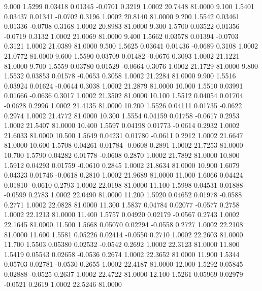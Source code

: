    9.000   1.5299   0.03418   0.01345  -0.0701   0.3219   1.0002  20.7448  81.0000
   9.100   1.5401   0.03437   0.01341  -0.0702   0.3196   1.0002  20.8140  81.0000
   9.200   1.5542   0.03461   0.01336  -0.0708   0.3168   1.0002  20.8983  81.0000
   9.300   1.5700   0.03522   0.01356  -0.0719   0.3132   1.0002  21.0069  81.0000
   9.400   1.5662   0.03578   0.01394  -0.0703   0.3121   1.0002  21.0389  81.0000
   9.500   1.5625   0.03641   0.01436  -0.0689   0.3108   1.0002  21.0772  81.0000
   9.600   1.5590   0.03709   0.01482  -0.0676   0.3093   1.0002  21.1221  81.0000
   9.700   1.5559   0.03780   0.01529  -0.0664   0.3076   1.0002  21.1729  81.0000
   9.800   1.5532   0.03853   0.01578  -0.0653   0.3058   1.0002  21.2284  81.0000
   9.900   1.5516   0.03924   0.01624  -0.0644   0.3038   1.0002  21.2879  81.0000
  10.000   1.5510   0.03991   0.01666  -0.0636   0.3017   1.0002  21.3502  81.0000
  10.100   1.5512   0.04054   0.01704  -0.0628   0.2996   1.0002  21.4135  81.0000
  10.200   1.5526   0.04111   0.01735  -0.0622   0.2974   1.0002  21.4772  81.0000
  10.300   1.5554   0.04159   0.01758  -0.0617   0.2953   1.0002  21.5407  81.0000
  10.400   1.5597   0.04198   0.01773  -0.0614   0.2932   1.0002  21.6033  81.0000
  10.500   1.5649   0.04231   0.01780  -0.0611   0.2912   1.0002  21.6647  81.0000
  10.600   1.5708   0.04261   0.01784  -0.0608   0.2891   1.0002  21.7253  81.0000
  10.700   1.5790   0.04282   0.01778  -0.0608   0.2870   1.0002  21.7892  81.0000
  10.800   1.5912   0.04293   0.01759  -0.0610   0.2845   1.0002  21.8634  81.0000
  10.900   1.6079   0.04323   0.01746  -0.0618   0.2810   1.0002  21.9689  81.0000
  11.000   1.6066   0.04424   0.01810  -0.0610   0.2793   1.0002  22.0198  81.0000
  11.100   1.5998   0.04531   0.01888  -0.0599   0.2783   1.0002  22.0490  81.0000
  11.200   1.5920   0.04652   0.01978  -0.0588   0.2771   1.0002  22.0828  81.0000
  11.300   1.5837   0.04784   0.02077  -0.0577   0.2758   1.0002  22.1213  81.0000
  11.400   1.5757   0.04920   0.02179  -0.0567   0.2743   1.0002  22.1645  81.0000
  11.500   1.5668   0.05070   0.02294  -0.0558   0.2727   1.0002  22.2108  81.0000
  11.600   1.5581   0.05226   0.02414  -0.0550   0.2710   1.0002  22.2603  81.0000
  11.700   1.5503   0.05380   0.02532  -0.0542   0.2692   1.0002  22.3123  81.0000
  11.800   1.5419   0.05543   0.02658  -0.0536   0.2674   1.0002  22.3652  81.0000
  11.900   1.5344   0.05703   0.02781  -0.0530   0.2655   1.0002  22.4187  81.0000
  12.000   1.5292   0.05845   0.02888  -0.0525   0.2637   1.0002  22.4722  81.0000
  12.100   1.5261   0.05969   0.02979  -0.0521   0.2619   1.0002  22.5246  81.0000
